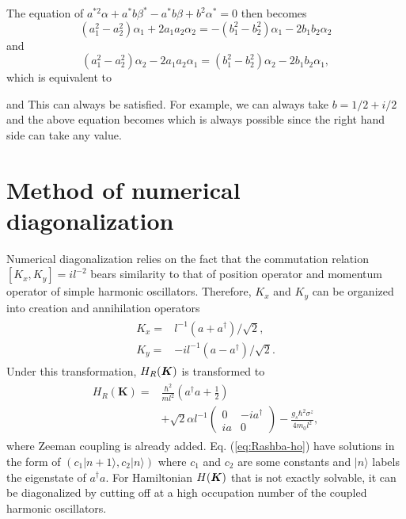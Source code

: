 \documentclass[aps, prb, showpacs, twocolumn, notitlepage, superscriptaddress]{revtex4-1}
\begin{document}
The equation of $a^{*2}\alpha+a^{*}b\beta^{*}-a^{*}b\beta+b^{2}\alpha^{*}=0$ then becomes
\begin{equation}
(a_{1}^{2}-a_{2}^{2})\alpha_{1}+2a_{1}a_{2}\alpha_{2}=-(b_{1}^{2}-b_{2}^{2})\alpha_{1}-2b_{1}b_{2}\alpha_{2}
\end{equation}
and 
\begin{equation}
    (a_{1}^{2}-a_{2}^{2})\alpha_{2}-2a_{1}a_{2}\alpha_{1}=(b_{1}^{2}-b_{2}^{2})\alpha_{2}-2b_{1}b_{2}\alpha_{1},
\end{equation}
which is equivalent to 

and 
This can always be satisfied. For example, we can always take $b=1/2+i/2$
and the above equation becomes
which is always possible since the right hand side  can take any value.


\section{Method of numerical diagonalization}\label{sec:numerical}

Numerical diagonalization relies on the fact that the commutation relation $[K_x,K_y]=il^{-2}$ bears similarity to that of position operator and momentum operator of simple harmonic oscillators. Therefore, $K_x$ and $K_y$ can be organized into creation and annihilation operators
\begin{align}
\begin{split}
K_x=&l^{-1}(a+a^\dagger)/\sqrt{2},\\
K_y=&-il^{-1}(a-a^\dagger)/\sqrt{2}.
\end{split}
\end{align}
Under this transformation, $H_R(\boldsymbol{K})$ is transformed to
\begin{align}
\begin{split}
H_{R}(\boldsymbol{K})=&\frac{\hbar^2}{ml^2}(a^{\dagger}a+\frac{1}{2})
\\&+\sqrt{2}\alpha l^{-1}\left(\begin{array}{cc}
0 & -ia^{\dagger}\\
ia & 0
\end{array}\right)
-\frac{g_s\hbar^2\sigma^z}{4m_0l^2},
\end{split}\label{eq:Rashba-ho}
\end{align}
where Zeeman coupling is already added. Eq. (\ref{eq:Rashba-ho}) have solutions in the form of $(c_1|n+1\rangle,c_2|n\rangle)$ where $c_1$ and $c_2$ are some constants and $|n\rangle$ labels the eigenstate of $a^\dagger a$. For Hamiltonian $H(\boldsymbol{K})$ that is not exactly solvable, it can be diagonalized by cutting off at a high occupation number of the coupled harmonic oscillators.
\end{document}
